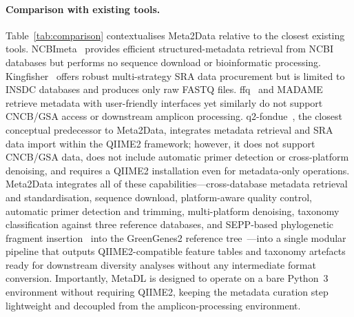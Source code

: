 \paragraph{Comparison with existing tools.}
Table~\ref{tab:comparison} contextualises Meta2Data relative to the closest
existing tools.
NCBImeta~\citep{eaton2020ncbimeta} provides efficient structured-metadata retrieval
from NCBI databases but performs no sequence download or bioinformatic processing.
Kingfisher~\citep{woodcroft2024kingfisher} offers robust multi-strategy SRA data
procurement but is limited to INSDC databases and produces only raw FASTQ files.
ffq~\citep{galvez2023ffq} and MADAME~\citep{fumagalli2023madame} retrieve metadata
with user-friendly interfaces yet similarly do not support CNCB/GSA access or
downstream amplicon processing.
q2-fondue~\citep{ziemski2022q2fondue}, the closest conceptual predecessor to
Meta2Data, integrates metadata retrieval and SRA data import within the QIIME2
framework; however, it does not support CNCB/GSA data, does not include automatic
primer detection or cross-platform denoising, and requires a QIIME2 installation
even for metadata-only operations.
Meta2Data integrates all of these capabilities---cross-database metadata retrieval
and standardisation, sequence download, platform-aware quality control, automatic
primer detection and trimming, multi-platform denoising, taxonomy classification
against three reference databases, and SEPP-based phylogenetic fragment
insertion~\citep{mirarab2012sepp} into the GreenGenes2 reference
tree~\citep{mcdonald2024greengenes2}---into a single modular pipeline that
outputs QIIME2-compatible feature tables and taxonomy artefacts ready for
downstream diversity analyses without any intermediate format conversion.
Importantly, MetaDL is designed to operate on a bare Python~3 environment without
requiring QIIME2, keeping the metadata curation step lightweight and decoupled from
the amplicon-processing environment.

